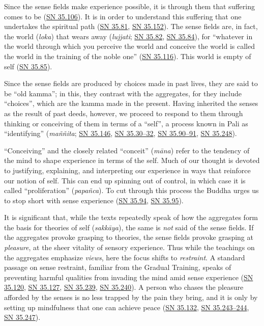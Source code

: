 \documentclass[12pt,openany]{book}%
\begin{document}
Since the sense fields make experience possible, it is through them that suffering comes to be (\href{https://suttacentral.net/sn35.106}{SN 35.106}). It is in order to understand this suffering that one undertakes the spiritual path (\href{https://suttacentral.net/sn35.81}{SN 35.81}, \href{https://suttacentral.net/sn35.152}{SN 35.152}). The sense fields are, in fact, the world (\textit{loka}) that wears away (\textit{lujjati}; \href{https://suttacentral.net/sn35.82}{SN 35.82}, \href{https://suttacentral.net/sn35.84}{SN 35.84}), for “whatever in the world through which you perceive the world and conceive the world is called the world in the training of the noble one” (\href{https://suttacentral.net/sn35.116}{SN 35.116}). This world is empty of self (\href{https://suttacentral.net/sn35.85}{SN 35.85}).

Since the sense fields are produced by choices made in past lives, they are said to be “old kamma”; in this, they contrast with the aggregates, for they include “choices”, which are the kamma made in the present. Having inherited the senses as the result of past deeds, however, we proceed to respond to them through thinking or conceiving of them in terms of a “self”, a process known in Pali as “identifying” (\textit{\textsanskrit{maññita}}; \href{https://suttacentral.net/sn35.146}{SN 35.146}, \href{https://suttacentral.net/sn35.30}{SN 35.30–32}, \href{https://suttacentral.net/sn35.90}{SN 35.90–91}, \href{https://suttacentral.net/sn35.248}{SN 35.248}).

“Conceiving” and the closely related “conceit” (\textit{\textsanskrit{māna}}) refer to the tendency of the mind to shape experience in terms of the self. Much of our thought is devoted to justifying, explaining, and interpreting our experience in ways that reinforce our notion of self. This can end up spinning out of control, in which case it is called “proliferation” (\textit{\textsanskrit{papañca}}). To cut through this process the Buddha urges us to stop short with sense experience (\href{https://suttacentral.net/sn35.94}{SN 35.94}, \href{https://suttacentral.net/sn35.95}{SN 35.95}).

It is significant that, while the texts repeatedly speak of how the aggregates form the basis for theories of self (\textit{\textsanskrit{sakkāya}}), the same is \emph{not} said of the sense fields. If the aggregates provoke grasping to theories, the sense fields provoke grasping at \emph{pleasure}, at the sheer vitality of sensory experience. Thus while the teachings on the aggregates emphasize \emph{views}, here the focus shifts to \emph{restraint}. A standard passage on sense restraint, familiar from the Gradual Training, speaks of preventing harmful qualities from invading the mind amid sense experience (\href{https://suttacentral.net/sn35.120}{SN 35.120}, \href{https://suttacentral.net/sn35.127}{SN 35.127}, \href{https://suttacentral.net/sn35.239}{SN 35.239}, \href{https://suttacentral.net/sn35.240}{SN 35.240}). A person who chases the pleasure afforded by the senses is no less trapped by the pain they bring, and it is only by setting up mindfulness that one can achieve peace (\href{https://suttacentral.net/sn35.132}{SN 35.132}, \href{https://suttacentral.net/sn35.243}{SN 35.243–244}, \href{https://suttacentral.net/sn35.247}{SN 35.247}).
\end{document}
